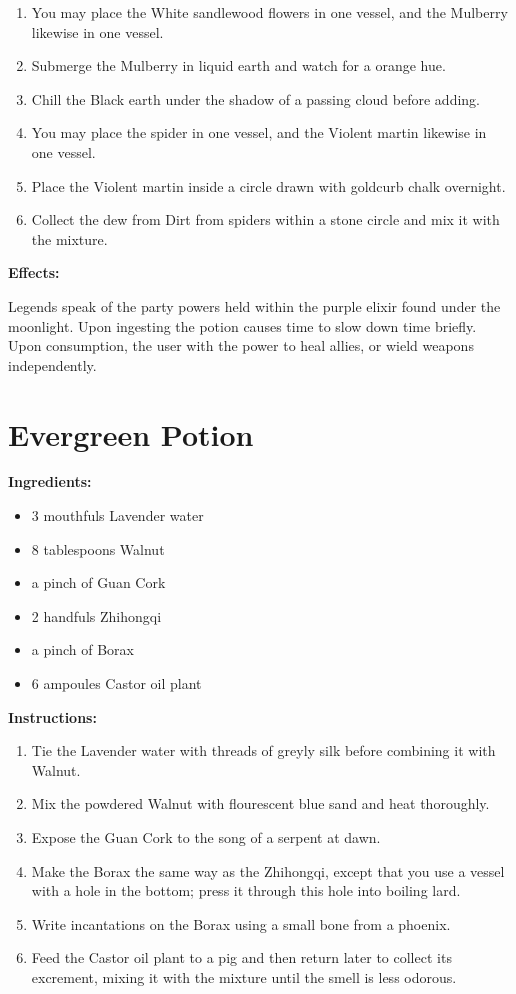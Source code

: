 \documentclass{article}
\begin{document}
\begin{enumerate}
  \item You may place the White sandlewood flowers in one vessel, and the Mulberry likewise in one vessel.
  \item Submerge the Mulberry in liquid earth and watch for a orange hue.
  \item Chill the Black earth under the shadow of a passing cloud before adding.
  \item You may place the spider in one vessel, and the Violent martin likewise in one vessel.
  \item Place the Violent martin inside a circle drawn with goldcurb chalk overnight.
  \item Collect the dew from Dirt from spiders within a stone circle and mix it with the mixture.
\end{enumerate}

\textbf{Effects:}

Legends speak of the party powers held within the purple elixir found under the moonlight. Upon ingesting the potion causes time to slow down time briefly. Upon consumption, the user with the power to heal allies, or wield weapons independently.

\newpage
\section*{Evergreen Potion}

\textbf{Ingredients:}

\begin{itemize}
  \item 3 mouthfuls Lavender water
  \item 8 tablespoons Walnut
  \item a pinch of Guan Cork
  \item 2 handfuls Zhihongqi
  \item a pinch of Borax
  \item 6 ampoules Castor oil plant
\end{itemize}

\textbf{Instructions:}

\begin{enumerate}
  \item Tie the Lavender water with threads of greyly silk before combining it with Walnut.
  \item Mix the powdered Walnut with flourescent blue sand and heat thoroughly.
  \item Expose the Guan Cork to the song of a serpent at dawn.
  \item Make the Borax the same way as the Zhihongqi, except that you use a vessel with a hole in the bottom; press it through this hole into boiling lard.
  \item Write incantations on the Borax using a small bone from a phoenix.
  \item Feed the Castor oil plant to a pig and then return later to collect its excrement, mixing it with the mixture until the smell is less odorous.
\end{enumerate}
\end{document}
